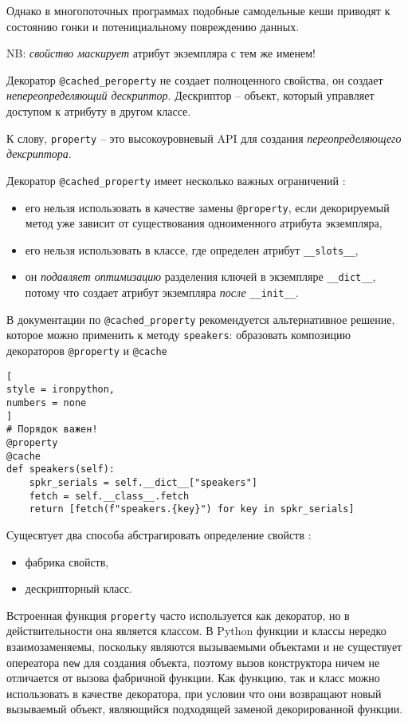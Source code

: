 \documentclass[%
	11pt,
	a4paper,
	utf8,
		]{article}
\begin{document}
Однако в многопоточных программах подобные самодельные кеши приводят к состоянию гонки и потенициальному повреждению данных.

{\color{red}NB: \emph{свойство маскирует} атрибут экземпляра с тем же именем! \cite[]{ramalho:python-2022}}

Декоратор \verb|@cached_peroperty| не создает полноценного свойства, он создает \emph{непереопределяющий дескриптор}. Дескриптор -- объект, который управляет доступом к атрибуту в другом классе.

К слову, \verb*|property| -- это высокоуровневый API для создания \emph{переопределяющего дексриптора}.

Декоратор \verb|@cached_property| имеет несколько важных ограничений \cite[]{ramalho:python-2022}:
\begin{itemize}
	\item его нельзя использовать в качестве замены \verb*|@property|, если декорируемый метод уже зависит от существования одноименного атрибута экземпляра,
	
	\item его нельзя использовать в классе, где определен атрибут \verb|__slots__|,
	
	\item он \emph{подавляет оптимизацию} разделения ключей в экземпляре \verb*|__dict__|, потому что создает атрибут экземпляра \emph{после} \verb|__init__|.
\end{itemize}

В документации по \verb*|@cached_property| рекомендуется альтернативное решение, которое можно применить к методу \verb|speakers|: образовать композицию декораторов \verb*|@property| и \verb|@cache|
\begin{lstlisting}[
style = ironpython,
numbers = none
]
# Порядок важен!
@property
@cache
def speakers(self):
    spkr_serials = self.__dict__["speakers"]
    fetch = self.__class__.fetch
    return [fetch(f"speakers.{key}") for key in spkr_serials]
\end{lstlisting}

Сущесвтует два способа абстрагировать определение свойств \cite[]{ramalho:python-2022}:
\begin{itemize}
	\item фабрика свойств,
	
	\item дескрипторный класс.
\end{itemize}

Встроенная функция \verb*|property| часто используется как декоратор, но в действительности она является классом. В Python функции и классы нередко взаимозаменяемы, поскольку являются вызываемыми объектами и не существует опереатора \verb|new| для создания объекта, поэтому вызов конструктора ничем не отличается от вызова фабричной функции. Как функцию, так и класс можно использовать в качестве декоратора, при условии что они возвращают новый вызываемый объект, являющийся подходящей заменой декорированной функции.
\end{document}
